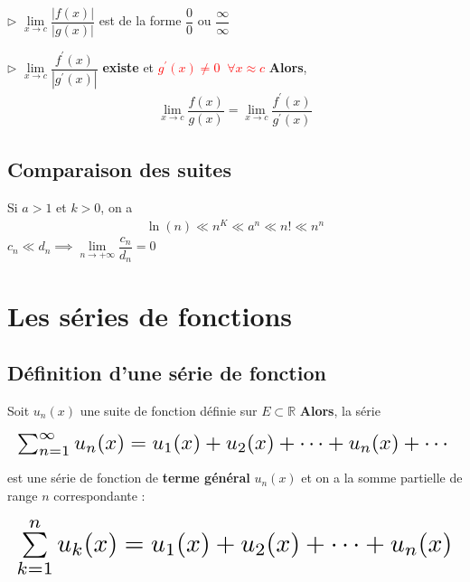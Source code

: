 \documentclass{report}
\begin{document}
\begin{multicols*}{3}
        \noindent 
        $\rhd $ $\lim\limits_{x\to c}\dfrac{|f(x)|}{|g(x)|}$ 
            est de la forme $\dfrac{0}{0}$ \; ou \; 
            $\dfrac{\infty }{\infty }$
        

        \noindent
        $\rhd$ $\lim\limits_{x\to c}\dfrac{f^{\prime}(x)}{|g^{\prime}(x)|}$
            \textbf{existe} et 
            \textcolor{red}{$g^{\prime}(x) \neq 0 \;\; \forall x \approx c$ }
        \textbf{Alors}, 
        \begin{align*}
            \boxed{ 
            \lim\limits_{x\to c}\dfrac{f(x)}{g(x)} = 
            \lim\limits_{x\to c}\dfrac{f^{\prime}(x)}{g^{\prime}(x)}
            }
        \end{align*}

                        

    \section{Comparaison des suites}
        Si $a > 1$ et $k > 0$, on a 
        \begin{align*}
            \ln(n) \ll n^K \ll a^n \ll n! \ll n^n
        \end{align*}
        $c_n \ll d_n \implies 
        \lim\limits_{n\to+\infty }\dfrac{c_n}{d_n} = 0$ 



    \chapter{Les séries de fonctions}

    \section{Définition d'une série de fonction}
        Soit $u_n(x)$ une suite de fonction définie sur $E \subset \mathbb{R}$ 
        \textbf{Alors}, la série  
    

        \begin{align*}
        \resizebox{1\linewidth}{!}{$ 
            \sum_{n=1}^{\infty }u_n(x) = u_1(x) + u_2(x) + \cdots + u_n(x) + \cdots
        $}
        \end{align*}                    

    est une série de fonction de \textbf{terme général}  
    $u_n(x)$ et on a la somme partielle de range $n$ correspondante : 


    \begin{align*}
    \resizebox{1\linewidth}{!}{$ 
        \sum\limits_{k=1}^{n}u_k(x) =  
        u_1(x) + u_2(x) + \cdots + u_n(x)
    $}
    \end{align*}
    

\end{multicols*}
\end{document}
